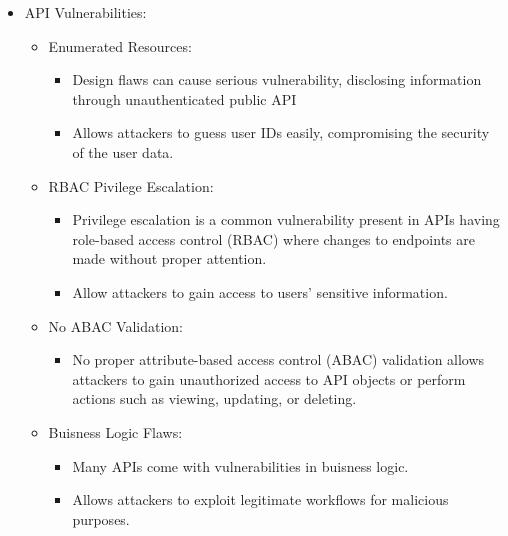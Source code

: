 \begin{itemize}
    \item API Vulnerabilities:
    \begin{itemize}
        \item Enumerated Resources:
        \begin{itemize}
            \item Design flaws can cause serious vulnerability, disclosing information through unauthenticated public API
            \item Allows attackers to guess user IDs easily, compromising the security of the user data.
        \end{itemize}
        \item RBAC Pivilege Escalation: 
        \begin{itemize}
            \item Privilege escalation is a common vulnerability present in APIs having role-based access control (RBAC) where changes to endpoints are made without proper attention.
            \item Allow attackers to gain access to users' sensitive information.
        \end{itemize}
        \item No ABAC Validation:
        \begin{itemize}
            \item No proper attribute-based access control (ABAC) validation allows attackers to gain unauthorized access to API objects or perform actions such as viewing, updating, or deleting.
        \end{itemize}
        \item Buisness Logic Flaws:
        \begin{itemize}
            \item Many APIs come with vulnerabilities in buisness logic.
            \item Allows attackers to exploit legitimate workflows for malicious purposes.
        \end{itemize}
    \end{itemize}
\end{itemize}
